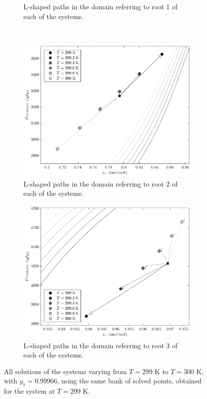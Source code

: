 \documentclass[journal=iecred,manuscript=article]{achemso}
\theoremstyle{definition}
\theoremstyle{remark}
\begin{document}
\begin{figure}[!hb]
\begin{subfigure}{.48\textwidth}
  \caption{L-shaped paths in the domain referring to root 1 of each of the systems.}
  \label{fig:unique_bank_root_1}
\end{subfigure}\\
\begin{subfigure}{.48\textwidth}
  \centering
  \includegraphics[width=\linewidth]{caminhos_L_dominio_unico_banco2.pdf}
  \caption{L-shaped paths in the domain referring to root 2 of each of the systems.}
  \label{fig:unique_bank_root_2}
\end{subfigure}\hfill
\begin{subfigure}{.48\textwidth}
  \centering
  \includegraphics[width=\linewidth]{caminhos_L_dominio_unico_banco3.pdf}
  \caption{L-shaped paths in the domain referring to root 3 of each of the systems.}
  \label{fig:unique_bank_root_3}
\end{subfigure}
\caption{All solutions of the systems varying from $ T = 299 $ K to $ T = 300 $ K, with $ y_{1} = 0.99966 $, using the same bank of solved points, obtained for the system at $ T = 299 $ K.}
\label{fig:sequencia_inversao}
\end{figure}
\end{document}
